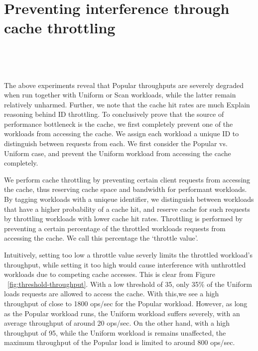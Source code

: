 \documentclass[twocolumn]{article}
\begin{document}
\section{Preventing interference through cache throttling}
\label{sec:solution}


\begin{figure*}[ht!]\footnotesize
  \centering
  \mbox {
  \qquad
  \qquad
  }
  \caption{Effects of throttling Uniform in Popular vs. Uniform}
  \label{fig:threshold-throughput}
\end{figure*}


\begin{figure*}[ht!]\footnotesize
  \centering
  \mbox {
  \qquad
  }
  \caption{Effects of throttling Uniform in Popular vs. Uniform}
  \label{fig:threshold-bars}
\end{figure*}

The above experiments reveal that Popular throughputs are severely degraded when run together with Uniform or Scan workloads, while the latter remain relatively unharmed. Further, we note that the cache hit rates are much 
Explain reasoning behind ID throttling. To conclusively prove that the source of performance bottleneck is the cache, we first completely prevent one of the workloads from accessing the cache. We assign each workload a unique ID to distinguish between requests from each. We first consider the Popular vs. Uniform case, and prevent the Uniform workload from accessing the cache completely. 

We perform cache throttling by preventing certain client requests from accessing the cache, thus reserving cache space and bandwidth for performant workloads. By tagging workloads with a uniqeue identifier, we distinguish between workloads that have a higher probability of a cache hit, and reserve cache for such requests by throttling workloads with lower cache hit rates. Throttling is performed by preventing a certain percentage of the throttled workloads requests from accessing the cache. We call this percentage the `throttle value'. 

Intuitively, setting too low a throttle value severly limits the throttled workload's throughput, while setting it too high would cause interference with unthrottled workloads due to competing cache accesses. This is clear from Figure ~\ref{fig:threshold-throughput}. With a low threshold of 35, only 35\% of the Uniform loads requests are allowed to access the cache. With this,we see a high throughput of close to 1800 ops/sec for the Popular workload. However, as long as the Popular workload runs, the Uniform workload suffers severely, with an average throughput of around 20 ops/sec. On the other hand, with a high throughput of 95, while the Uniform workload is remains unaffected, the maximum throughput of the Popular load is limited to around 800 ops/sec.
\end{document}

